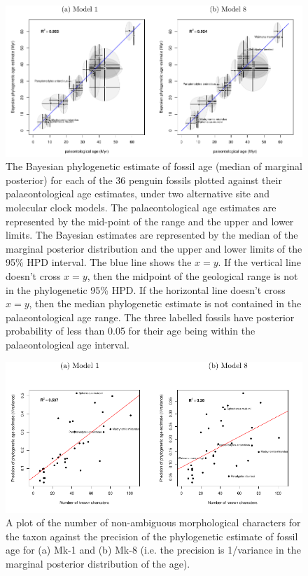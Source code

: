 \documentclass[11pt]{article}
\newcommand{\Mstrict}{{Mk-1}}
\newcommand{\Mrelaxed}{{Mk-8}}
\begin{document}
\begin{figure}
\includegraphics{Figure1.pdf}
\caption{\label{fig:phyloAgeVsGeoAge}
The Bayesian phylogenetic estimate of fossil age (median of marginal posterior) for each of the 36 penguin fossils plotted against their palaeontological age estimates, under two alternative site and molecular clock models. 
The palaeontological age estimates are represented by the mid-point of the range and the upper and lower limits. 
The Bayesian estimates are represented by the median of the marginal posterior distribution and the upper and lower limits of the 95\% HPD interval. 
The blue line shows the $x=y$. If the vertical line doesn't cross $x=y$, then the midpoint of the geological range is not in the phylogenetic 95\% HPD. 
If the horizontal line doesn't cross $x=y$, then the median phylogenetic estimate is not contained in the palaeontological age range. 
The three labelled fossils have posterior probability of less than 0.05 for their age being within the palaeontological age interval.
}
\end{figure}

\begin{figure}
\includegraphics[width=5in]{Figure2.pdf}
\caption{\label{fig:precisionVsnumberCharacters} A plot of the number of non-ambiguous morphological characters for the taxon against the precision of the phylogenetic estimate of fossil age for (a) \Mstrict{} and (b) \Mrelaxed{} (i.e. the precision is 1/variance in the marginal posterior distribution of the age).}
\end{figure}
\end{document}
